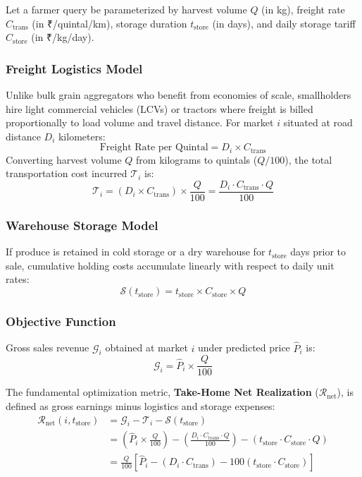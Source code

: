 \documentclass[conference]{IEEEtran}
\begin{document}
Let a farmer query be parameterized by harvest volume $Q$ (in kg), freight rate $C_{\text{trans}}$ (in ₹/quintal/km), storage duration $t_{\text{store}}$ (in days), and daily storage tariff $C_{\text{store}}$ (in ₹/kg/day).

\subsubsection{Freight Logistics Model}
Unlike bulk grain aggregators who benefit from economies of scale, smallholders hire light commercial vehicles (LCVs) or tractors where freight is billed proportionally to load volume and travel distance. For market $i$ situated at road distance $D_i$ kilometers:
\begin{equation}
\text{Freight Rate per Quintal} = D_i \times C_{\text{trans}}
\end{equation}
Converting harvest volume $Q$ from kilograms to quintals ($Q/100$), the total transportation cost incurred $\mathcal{T}_i$ is:
\begin{equation}
\mathcal{T}_i = (D_i \times C_{\text{trans}}) \times \frac{Q}{100} = \frac{D_i \cdot C_{\text{trans}} \cdot Q}{100}
\end{equation}

\subsubsection{Warehouse Storage Model}
If produce is retained in cold storage or a dry warehouse for $t_{\text{store}}$ days prior to sale, cumulative holding costs accumulate linearly with respect to daily unit rates:
\begin{equation}
\mathcal{S}(t_{\text{store}}) = t_{\text{store}} \times C_{\text{store}} \times Q
\end{equation}

\subsubsection{Objective Function}
Gross sales revenue $\mathcal{G}_i$ obtained at market $i$ under predicted price $\hat{P}_i$ is:
\begin{equation}
\mathcal{G}_i = \hat{P}_i \times \frac{Q}{100}
\end{equation}

The fundamental optimization metric, \textbf{Take-Home Net Realization} ($\mathcal{R}_{\text{net}}$), is defined as gross earnings minus logistics and storage expenses:
\begin{align}
\mathcal{R}_{\text{net}}(i, t_{\text{store}}) &= \mathcal{G}_i - \mathcal{T}_i - \mathcal{S}(t_{\text{store}}) \nonumber \\
&= \left( \hat{P}_i \times \frac{Q}{100} \right) - \left( \frac{D_i \cdot C_{\text{trans}} \cdot Q}{100} \right) - (t_{\text{store}} \cdot C_{\text{store}} \cdot Q) \nonumber \\
&= \frac{Q}{100} \left[ \hat{P}_i - (D_i \cdot C_{\text{trans}}) - 100(t_{\text{store}} \cdot C_{\text{store}}) \right]
\label{eq:full_net}
\end{align}
\end{document}
